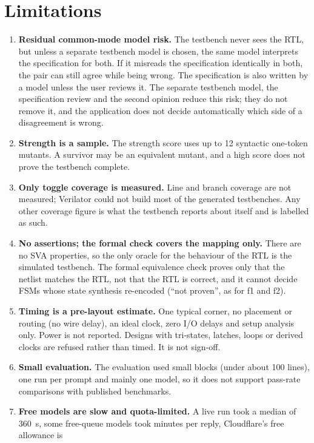 \section{Limitations}
\label{sec:limits}

\begin{enumerate}[label=\textbf{L\arabic*.},ref=L\arabic*]
\item \textbf{Residual common-mode model risk.} The testbench never sees the RTL,
but unless a separate testbench model is chosen, the same model interprets the
specification for both. If it misreads the specification identically in both, the
pair can still agree while being wrong. The specification is also written by a model
unless the user reviews it. The separate testbench model, the specification review
and the second opinion reduce this risk; they do not remove it, and the application
does not decide automatically which side of a disagreement is wrong.
\item \textbf{Strength is a sample.} The strength score uses up to 12 syntactic
one-token mutants. A survivor may be an equivalent mutant, and a high score does not
prove the testbench complete.
\item \textbf{Only toggle coverage is measured.} Line and branch coverage are not
measured; Verilator could not build most of the generated testbenches. Any other
coverage figure is what the testbench reports about itself and is labelled as such.
\item \textbf{No assertions; the formal check covers the mapping only.} There are no
SVA properties, so the only oracle for the behaviour of the RTL is the simulated
testbench. The formal equivalence check proves only that the netlist matches the RTL,
not that the RTL is correct, and it cannot decide FSMs whose state synthesis
re-encoded (``not proven'', as for f1 and f2).
\item \textbf{Timing is a pre-layout estimate.} One typical corner, no placement or
routing (no wire delay), an ideal clock, zero I/O delays and setup analysis only.
Power is not reported. Designs with tri-states, latches, loops or derived clocks are
refused rather than timed. It is not sign-off.
\item \textbf{Small evaluation.} The evaluation used small blocks (under about 100
lines), one run per prompt and mainly one model, so it does not support pass-rate
comparisons with published benchmarks.
\item \textbf{Free models are slow and quota-limited.} A live run took a median of
360~s, some free-queue models took minutes per reply, Cloudflare's free allowance is

\end{enumerate}
